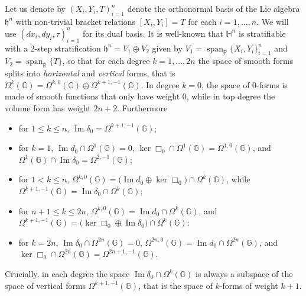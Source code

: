 \documentclass[dvipsnames]{amsart}
\theoremstyle{definition}
\theoremstyle{definition}
\numberwithin{equation}{section}
\newcommand{\R}{\mathbb{R}}
\newcommand{\G}{\mathbb{G}}
\begin{document}
    Let us denote by $(X_i,Y_i,T)_{i=1}^n$ denote the orthonormal basis of the Lie algebra $\mathfrak{h}^n$ with non-trivial bracket relations $[X_i,Y_i]=T$ for each $i=1,\ldots,n$. We will use $(dx_i,dy_i,\tau)_{i=1}^n$ for its dual basis. It is well-known that $\mathbb H^n$ is stratifiable with a 2-step stratification $\mathfrak{h}^n=V_1\oplus V_2$ given by $V_1=\operatorname{span}_\R\{X_i,Y_i\}_{i=1}^n$ and $V_2=\operatorname{span}_\R\{T\}$, so that for each degree $k=1,\ldots,2n$ the space of smooth forms splits into \textit{horizontal} and \textit{vertical} forms, that is $\Omega^k(\G)=\Omega^{k,0}(\G)\oplus\Omega^{k+1,-1}(\G)$. In degree $k=0$, the space of 0-forms is made of smooth functions that only have weight 0, while in top degree the volume form has weight $2n+2$. Furthermore
    \begin{itemize}
        \item for $1\le k\le n$, $\operatorname{Im}\delta_0=\Omega^{k+1,-1}(\G)$;
        \item for $k=1$, $\operatorname{Im}d_0\cap\Omega^1(\G)=0$, $\ker \Box_0\cap\Omega^1(\G)=\Omega^{1,0}(\G)$, and $\Omega^{1}(\G)\cap\operatorname{Im}\delta_0=\Omega^{2,-1}(\G)$;
        \item for $1<k\le n$, $\Omega^{k,0}(\G)=\big(\operatorname{Im}d_0\oplus\ker\Box_0\big)\cap\Omega^k(\G)$, while $\Omega^{k+1,-1}(\G)=\operatorname{Im}\delta_0\cap\Omega^k(\G)$;
        \item for $n+1\le k\le 2n$,  $\Omega^{k,0}(\G)=\operatorname{Im}d_0\cap\Omega^{k}(\G)$, and $\Omega^{k+1,-1}(\G)=\big(\ker\Box_0\oplus\operatorname{Im}\delta_0\big)\cap\Omega^k(\G)$;
        \item for $k=2n$, $\operatorname{Im}\delta_0\cap\Omega^{2n}(\G)=0$, $\Omega^{2n,0}(\G)=\operatorname{Im}d_0\cap\Omega^{2n}(\G)$, and $\ker\Box_0\cap\Omega^{2n}(\G)=\Omega^{2n+1,-1}(\G)$.
    \end{itemize}
    Crucially, in each degree the space $\operatorname{Im}\delta_0\cap\Omega^k(\G)$ is always a subspace of the space of vertical forms $\Omega^{k+1,-1}(\G)$, that is the space of $k$-forms of weight $k+1$.
    
\end{document}
